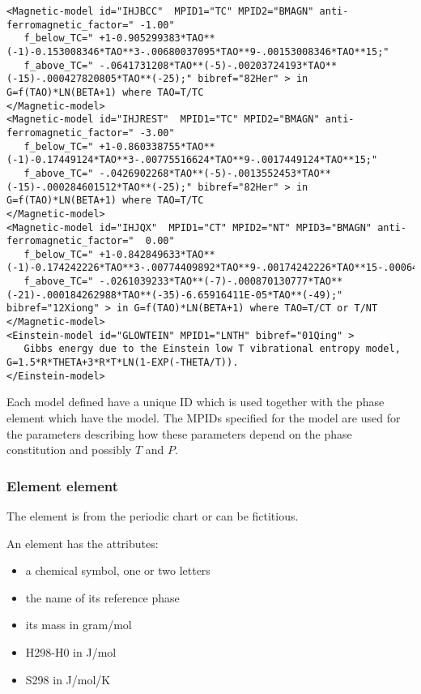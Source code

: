 \documentclass[12pt]{article}
\begin{document}
\begin{appendices}
{\tiny
\begin{verbatim}
<Magnetic-model id="IHJBCC"  MPID1="TC" MPID2="BMAGN" anti-ferromagnetic_factor=" -1.00" 
   f_below_TC=" +1-0.905299383*TAO**(-1)-0.153008346*TAO**3-.00680037095*TAO**9-.00153008346*TAO**15;"
   f_above_TC=" -.0641731208*TAO**(-5)-.00203724193*TAO**(-15)-.000427820805*TAO**(-25);" bibref="82Her" > in G=f(TAO)*LN(BETA+1) where TAO=T/TC
</Magnetic-model>
<Magnetic-model id="IHJREST"  MPID1="TC" MPID2="BMAGN" anti-ferromagnetic_factor=" -3.00" 
   f_below_TC=" +1-0.860338755*TAO**(-1)-0.17449124*TAO**3-.00775516624*TAO**9-.0017449124*TAO**15;"
   f_above_TC=" -.0426902268*TAO**(-5)-.0013552453*TAO**(-15)-.000284601512*TAO**(-25);" bibref="82Her" > in G=f(TAO)*LN(BETA+1) where TAO=T/TC
</Magnetic-model>
<Magnetic-model id="IHJQX"  MPID1="CT" MPID2="NT" MPID3="BMAGN" anti-ferromagnetic_factor="  0.00" 
   f_below_TC=" +1-0.842849633*TAO**(-1)-0.174242226*TAO**3-.00774409892*TAO**9-.00174242226*TAO**15-.000646538871*TAO**21;"
   f_above_TC=" -.0261039233*TAO**(-7)-.000870130777*TAO**(-21)-.000184262988*TAO**(-35)-6.65916411E-05*TAO**(-49);" bibref="12Xiong" > in G=f(TAO)*LN(BETA+1) where TAO=T/CT or T/NT
</Magnetic-model>
<Einstein-model id="GLOWTEIN" MPID1="LNTH" bibref="01Qing" > 
   Gibbs energy due to the Einstein low T vibrational entropy model, G=1.5*R*THETA+3*R*T*LN(1-EXP(-THETA/T)).
</Einstein-model>
\end{verbatim}
}

Each model defined have a unique ID which is used together with the
phase element which have the model.  The MPIDs specified for the model
are used for the parameters describing how these parameters depend on
the phase constitution and possibly $T$ and $P$.

\subsubsection{Element element}

The element is from the periodic chart or can be fictitious.

An element has the attributes:
\begin{itemize}
\item a chemical symbol, one or two letters
\item the name of its reference phase
\item its mass in gram/mol
\item H298-H0 in J/mol
\item S298 in J/mol/K
\end{itemize}


\end{appendices}
\end{document}
